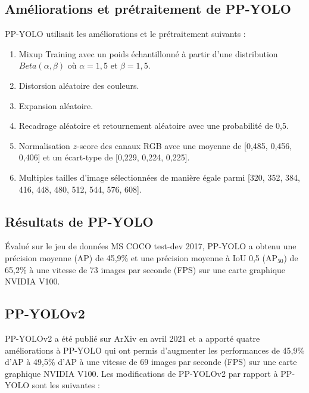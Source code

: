 \documentclass{article}
\begin{document}
\subsection{Améliorations et prétraitement de PP-YOLO}

PP-YOLO utilisait les améliorations et le prétraitement suivants :

\begin{enumerate}
    \item Mixup Training \cite{85} avec un poids échantillonné à partir d'une distribution $Beta(\alpha, \beta)$ où $\alpha = 1,5$ et $\beta = 1,5$.
    \item Distorsion aléatoire des couleurs.
    \item Expansion aléatoire.
    \item Recadrage aléatoire et retournement aléatoire avec une probabilité de 0,5.
    \item Normalisation $z$-score des canaux RGB avec une moyenne de [0,485, 0,456, 0,406] et un écart-type de [0,229, 0,224, 0,225].
    \item Multiples tailles d'image sélectionnées de manière égale parmi [320, 352, 384, 416, 448, 480, 512, 544, 576, 608].
\end{enumerate}

\subsection{Résultats de PP-YOLO}
Évalué sur le jeu de données MS COCO test-dev 2017, PP-YOLO a obtenu une précision moyenne (AP) de 45,9\% et une précision moyenne à IoU 0,5 (AP$_{50}$) de 65,2\% à une vitesse de 73 images par seconde (FPS) sur une carte graphique NVIDIA V100.



\subsection{PP-YOLOv2}
PP-YOLOv2 \cite{105} a été publié sur ArXiv en avril 2021 et a apporté quatre améliorations à PP-YOLO qui ont permis d'augmenter les performances de 45,9\% d'AP à 49,5\% d'AP à une vitesse de 69 images par seconde (FPS) sur une carte graphique NVIDIA V100. Les modifications de PP-YOLOv2 par rapport à PP-YOLO sont les suivantes :
\end{document}
